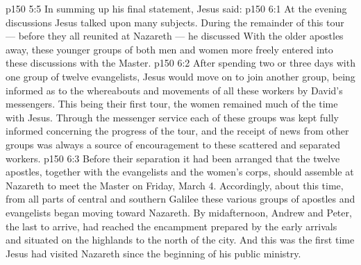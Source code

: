 \vs p150 5:5 In summing up his final statement, Jesus said: 
\vs p150 6:1 At the evening discussions Jesus talked upon many subjects. During the remainder of this tour --- before they all reunited at Nazareth --- he discussed  With the older apostles away, these younger groups of both men and women more freely entered into these discussions with the Master.
\vs p150 6:2 After spending two or three days with one group of twelve evangelists, Jesus would move on to join another group, being informed as to the whereabouts and movements of all these workers by David’s messengers. This being their first tour, the women remained much of the time with Jesus. Through the messenger service each of these groups was kept fully informed concerning the progress of the tour, and the receipt of news from other groups was always a source of encouragement to these scattered and separated workers.
\vs p150 6:3 Before their separation it had been arranged that the twelve apostles, together with the evangelists and the women’s corps, should assemble at Nazareth to meet the Master on Friday, March 4. Accordingly, about this time, from all parts of central and southern Galilee these various groups of apostles and evangelists began moving toward Nazareth. By midafternoon, Andrew and Peter, the last to arrive, had reached the encampment prepared by the early arrivals and situated on the highlands to the north of the city. And this was the first time Jesus had visited Nazareth since the beginning of his public ministry.
